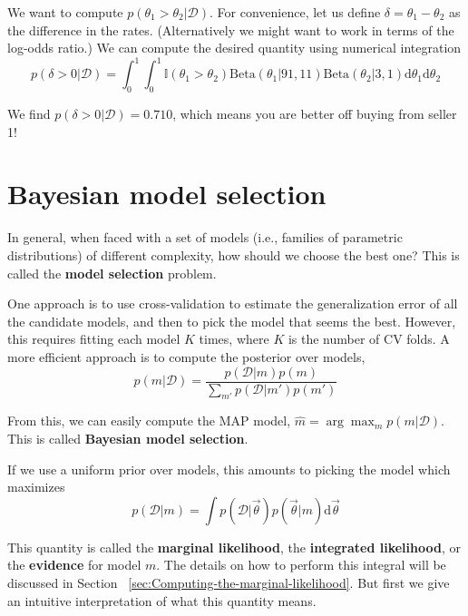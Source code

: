 We want to compute $p(\theta_1 >\theta_2|\mathcal{D})$. For convenience, let us define $\delta=\theta_1-\theta_2$ as the difference in the rates. (Alternatively we might want to work in terms of the log-odds ratio.) We can compute the desired quantity using numerical integration
\begin{equation}
p(\delta>0|\mathcal{D})=\int_0^1{\int_0^1{\mathbb{I}(\theta_1>\theta_2)\text{Beta}(\theta_1|91,11)\text{Beta}(\theta_2|3,1)}\mathrm{d}\theta_1}\mathrm{d}\theta_2
\end{equation}

We find $p(\delta>0|\mathcal{D})=0.710$, which means you are better off buying from seller 1! 


\section{Bayesian model selection}
In general, when faced with a set of models (i.e., families of parametric distributions) of different complexity, how should we choose the best one? This is called the \textbf{model selection} problem.

One approach is to use cross-validation to estimate the generalization error of all the candidate models, and then to pick the model that seems the best. However, this requires fitting each model $K$ times, where $K$ is the number of CV folds. A more efficient approach is to compute the posterior over models,
\begin{equation}
p(m|\mathcal{D})=\dfrac{p(\mathcal{D}|m)p(m)}{\sum_{m'}p(\mathcal{D}|m')p(m')}
\end{equation}

From this, we can easily compute the MAP model, $\hat{m}=\arg\max_m{p(m|\mathcal{D})}$. This is called \textbf{Bayesian model selection}.

If we use a uniform prior over models, this amounts to picking the model which maximizes
\begin{equation}\label{eqn:marginal-likelihood}
p(\mathcal{D}|m)=\int{p(\mathcal{D}|\vec{\theta})p(\vec{\theta}|m)}\mathrm{d}\vec{\theta}
\end{equation}

This quantity is called the \textbf{marginal likelihood}, the \textbf{integrated likelihood}, or the \textbf{evidence} for model $m$. The details on how to perform this integral will be discussed in Section ~\ref{sec:Computing-the-marginal-likelihood}. But first we give an intuitive interpretation of what this quantity means.



